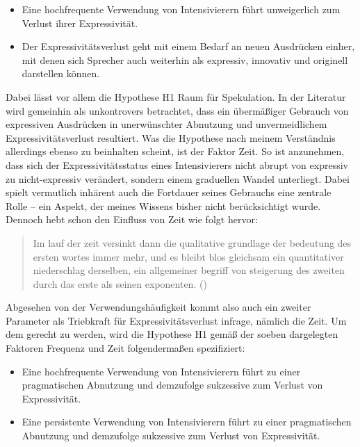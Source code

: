 \begin{itemize}
\item[\textbf{\textsc{H1}}] Eine hochfrequente Verwendung von Intensivierern führt unweigerlich zum Verlust ihrer Expressivität.

\item[\textbf{\textsc{H2}}] Der Expressivitätsverlust geht mit einem Bedarf an neuen Ausdrücken einher, mit denen sich Sprecher auch weiterhin als expressiv, innovativ und originell darstellen können.
\end{itemize}

\noindent Dabei lässt vor allem die Hypothese H1 Raum für Spekulation. In der Literatur wird gemeinhin als unkontrovers betrachtet, dass ein übermäßiger Gebrauch von expressiven Ausdrücken in unerwünschter Abnutzung und unvermeidlichem Expressivitätsverlust resultiert. Was die Hypothese nach meinem Verständnis allerdings ebenso zu beinhalten scheint, ist der Faktor Zeit. So ist anzunehmen, dass sich der Expressivitätsstatus eines Intensivierers nicht abrupt von expressiv zu nicht-expressiv verändert, sondern einem graduellen Wandel unterliegt. Dabei spielt vermutlich inhärent auch die Fortdauer seines Gebrauchs eine zentrale Rolle -- ein Aspekt, der meines Wissens bisher nicht berücksichtigt wurde. Dennoch hebt schon \citet[]{Tobler.1868} den Einfluss von Zeit wie folgt hervor:

\begin{singlespace*}
\begin{quotation} \noindent Im lauf der zeit versinkt dann die qualitative grundlage der bedeutung des ersten wortes immer mehr, und es bleibt blo\textlongs s gleichsam ein quantitativer niederschlag derselben, ein allgemeiner begriff von steigerung des zweiten durch das erste als seinen exponenten. \hfill (\citealt[59]{Tobler.1868}) \\ \end{quotation}
\end{singlespace*}

\noindent Abgesehen von der Verwendungshäufigkeit kommt also auch ein zweiter Parameter als Triebkraft für Expressivitätsverlust infrage, nämlich die Zeit. Um dem gerecht zu werden, wird die Hypothese H1 gemäß der soeben dargelegten Faktoren Frequenz und Zeit folgendermaßen spezifiziert: 

\begin{itemize} 
\setlength{\itemindent}{1cm}
\item[\textbf{\textsc{H1-Freq}}] Eine hochfrequente Verwendung von Intensivierern führt zu einer pragmatischen Abnutzung und demzufolge sukzessive zum Verlust von Expressivität. 

\item[\textbf{\textsc{H1-Temp}}] Eine persistente Verwendung von Intensivierern führt zu einer pragmatischen Abnutzung und demzufolge sukzessive zum Verlust von Expressivität. 
\end{itemize}

